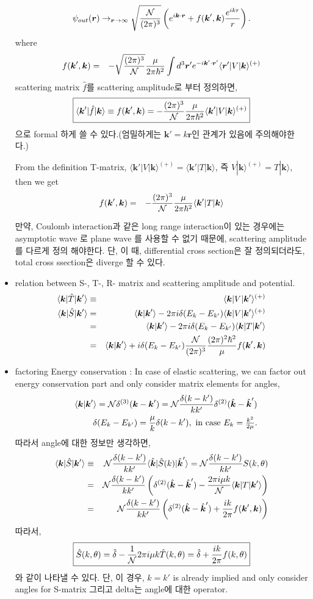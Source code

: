 \documentclass[10pt]{book}
\def\bm{\boldsymbol}
\newcommand{\bea}{\begin{eqnarray}}
\newcommand{\eea}{\end{eqnarray}}
\newcommand{\no}{\nonumber \\}
\def\vk{{\bm k}}
\def\vr{{\bm r}}
\def\la{\langle}
\def\ra{\rangle}
\begin{document}
\begin{itemize}
{} 
\bea
\psi_{out}(\vr)\to_{\vr\to \infty} \sqrt{\frac{\cal N}{(2\pi)^3}}
     \left(e^{i\vk\cdot\vr}+f(\vk',\vk)\frac{e^{ikr}}{r}\right).
\eea
where
\bea
f(\vk',\vk)&=&-\sqrt{\frac{(2\pi)^3}{\cal N}}\frac{\mu}{2\pi\hbar^2} 
                    \int d^3\vr' e^{-i\vk'\cdot\vr'}
                    \la \vr'|V|\vk\ra^{(+)}
\eea
scattering matrix $\hat{f}$를 scattering amplitude로 부터 정의하면,
\bea
\boxed{
\la \vk'|\hat{f}|\vk\ra\equiv f(\vk',\vk)
=-\frac{(2\pi)^3}{\cal N}\frac{\mu}{2\pi\hbar^2}\la \vk'|V|\vk\ra^{(+)}
}
\eea
으로 formal 하게 쓸 수 있다.(엄밀하게는 $\vk'=k\hat{\vr}$인
관계가 있음에 주의해야한다.)

From the definition T-matrix, 
$\la \vk'|V|\vk\ra^{(+)}=\la \vk' |T|\vk\ra $,
즉 $V|\vk\ra^{(+)}=T|\vk\ra$, 
then we get
\bea
f(\vk',\vk) &=&-\frac{(2\pi)^3}{\cal N}\frac{\mu}{2\pi\hbar^2}\la \vk'|T|\vk\ra
\eea

만약, Coulomb interaction과 같은 long range interaction이 있는 경우에는 
asymptotic wave 로 plane wave 를 사용할 수 없기 때문에,
scattering amplitude를 다르게 정의 해야한다. 
단, 이 때, differential cross section은 잘 정의되더라도, total cross ssection은 diverge 할 수 있다.


\item relation between S-, T-, R- matrix and scattering amplitude
and potential.
\bea
\la \vk|\hat{T}|\vk'\ra &\equiv& \la \vk|V|\vk'\ra^{(+)} \no
\la \vk|\hat{S}|\vk'\ra
&=&\la \vk|\vk'\ra-2\pi i\delta(E_k-E_{k'})\la \vk|V|\vk'\ra^{(+)}
\no
&=&\la \vk|\vk'\ra-2\pi i\delta(E_k-E_{k'})\la \vk|T|\vk'\ra \no
&=&\la \vk|\vk'\ra
   +i\delta(E_k-E_{k'}) \frac{\cal N}{(2\pi)^3} \frac{(2\pi)^2\hbar^2}{\mu}  f(\vk',\vk)
\eea

\item factoring Energy conservation : In case of elastic scattering,
     we can factor out energy conservation part and only consider 
     matrix elements for angles,
\bea
& &\la \vk|\vk'\ra={\cal N}\delta^{(3)}(\vk-\vk')
  ={\cal N}\frac{\delta(k-k')}{k k'}\delta^{(2)}(\hat{\vk}-\hat{\vk}')\no
& &\delta(E_k-E_{k'})=\frac{\mu}{k}\delta(k-k'),
  \mbox{ in case $E_k=\frac{k^2}{2\mu}$.} 
\eea
따라서 angle에 대한 정보만 생각하면,
\bea
\la \vk|\hat{S}|\vk'\ra
&\equiv&  {\cal N}\frac{\delta(k-k')}{k k'}\la\hat{\vk}|\hat{S}(k)|\hat{\vk}'\ra 
   = {\cal N}\frac{\delta(k-k')}{k k'} S(k,\theta) \no
&=&{\cal N}\frac{\delta(k-k')}{k k'}\left(\delta^{(2)}(\hat{\vk}-\hat{\vk}')
   -\frac{2\pi i \mu k}{\cal N} 
   \la \vk| T|\vk'\ra \right) \no
&=&{\cal N}\frac{\delta(k-k')}{k k'}\left(\delta^{(2)}(\hat{\vk}-\hat{\vk}')
   +\frac{i k}{2\pi}  f(\vk',\vk)\right) 
\eea
따라서,
\bea
\boxed{ 
\hat{S}(k,\theta)=\hat{\delta}-\frac{1}{\cal N}2\pi i \mu k \hat{T}(k,\theta)=\hat{\delta}+\frac{ik}{2\pi}f(k,\theta)
}
\eea
와 같이 나타낼 수 있다. 단, 이 경우, $k=k'$ is already implied and
only consider angles for S-matrix 그리고 delta는 angle에 대한 operator.


\end{itemize}
\end{document}
